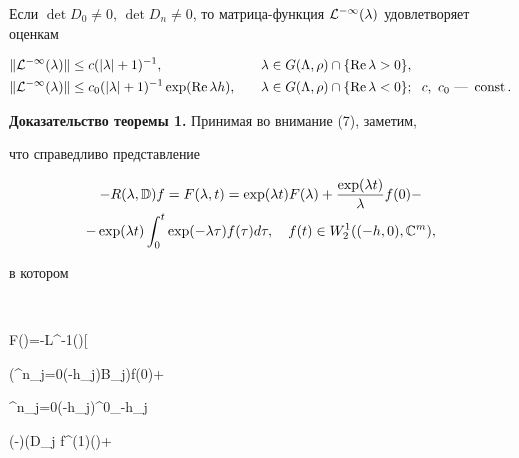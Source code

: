  


\begin{prop} 


Если $\det D_0\ne0$, $\det D_n\ne0$, то матрица-функция $\cal 


L^{-1}(\lambda)$ удовлетворяет оценкам 


\begin{alignat}{2} 


\|\cal L^{-1}(\lambda)\|&\le c(|\lambda|+1)^{-1}, &\quad 


\lambda&\in G(\Lambda,\rho)\cap\{\re\lambda>0\},\\ 


% 


\|\cal L^{-1}(\lambda)\|&\le c_0(|\lambda|+1)^{-1} 


\exp(\re\lambda h), &\quad \lambda&\in G(\Lambda,\rho) 


\cap\{\re\lambda<0\}; \ \; c,\ c_0\text{ --- }\const.


\end{alignat} 


\end{prop} 


 


{\bf Доказательство теоремы 1.} Принимая во внимание (7), заметим, 


что справедливо представление 


\begin{multline} 


-R(\lambda,\Bbb D)f=F(\lambda,t)=\exp(\lambda t)F(\lambda)+ 


\frac{\exp(\lambda t)}{\lambda}f(0)- \\


%


-\exp(\lambda t) 


\int^t_0\exp(-\lambda\tau)f(\tau)d\tau,\quad 


f(t)\in W^1_2((-h,0),\Bbb C^m), 


\end{multline} 


в котором 


$$ 


F(\lambda)=-\cal L^{-1}(\lambda)\bigg[ 


\bigg(\sum^n_{j=0}\exp(-\lambda h_j)B_j\bigg)f(0)+ 


\sum^n_{j=0}\exp(-\lambda h_j)\int^0_{-h_j} 


\exp(-\lambda\tau)(D_j f^{(1)}(\tau)+ 


